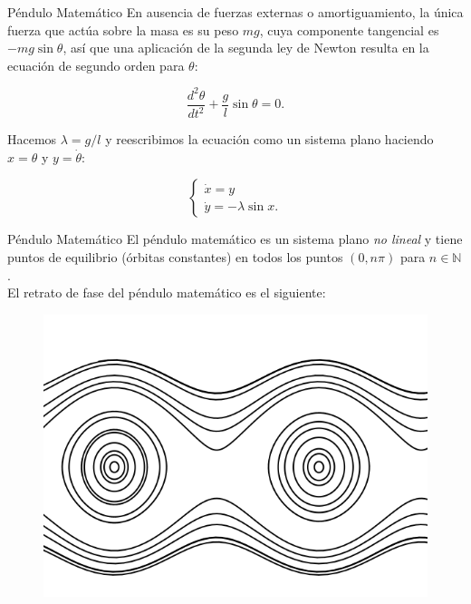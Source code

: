 \documentclass{beamer}
\newcommand{\N}{{\ensuremath{\mathbb{N}}}}
\begin{document}
\begin{frame}{Péndulo Matemático}
En ausencia de fuerzas externas o amortiguamiento, la única fuerza que actúa sobre la masa es su peso $mg$, cuya componente tangencial es $-mg\sin\theta$, así que una aplicación de la segunda ley de Newton resulta en la ecuación de segundo orden para $\theta$:

$$	\dfrac{d^2\theta}{dt^2} + \frac{g}{l}\sin\theta = 0.$$

Hacemos $\lambda = g/l$ y reescribimos la ecuación como un sistema plano haciendo $x = \theta$ y $y = \dot{\theta}$:

$$
\left\{	\begin{array}{l}
		\dot{x} = y \\
		\dot{y} = -\lambda \sin x.
	\end{array} \right.
$$
\end{frame}

\begin{frame}{Péndulo Matemático}
El péndulo matemático es un sistema plano \emph{no lineal} y tiene puntos de equilibrio (órbitas constantes) en todos los puntos $(0,n\pi)$ para $n \in \N$. \\
\pause
El retrato de fase del péndulo matemático es el siguiente:
\begin{figure}[!ht] \centering
	\includegraphics[scale=0.4]{../figures/pendulomatematico-fase.png}
\end{figure}
\end{frame}
\end{document}

